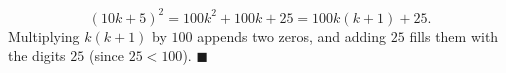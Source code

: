 \[(10k+5)^2=100k^2+100k+25=100k(k+1)+25.\]
Multiplying $k(k+1)$ by $100$ appends two zeros, and adding $25$ fills them with the digits $25$ (since $25<100$). $\blacksquare$
